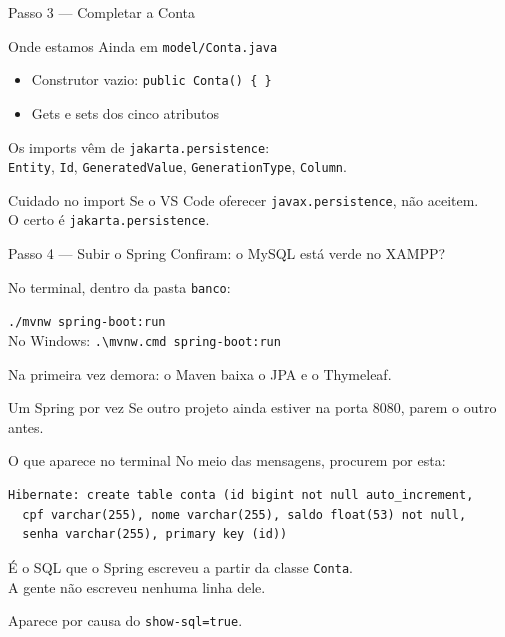 \documentclass[aspectratio=169,11pt]{beamer}
\newcommand{\onde}[1]{%
  \begin{block}{Onde estamos}
    #1
  \end{block}
}
\begin{document}
\begin{frame}{Passo 3 --- Completar a Conta}
  \onde{Ainda em \texttt{model/Conta.java}}

  \begin{itemize}
    \item Construtor vazio: \texttt{public Conta() \{ \}}
    \item Gets e sets dos cinco atributos
  \end{itemize}

  \vspace{0.5em}
  Os imports vêm de \texttt{jakarta.persistence}:\\
  \texttt{Entity}, \texttt{Id}, \texttt{GeneratedValue},
  \texttt{GenerationType}, \texttt{Column}.

  \vspace{0.5em}
  \begin{alertblock}{Cuidado no import}
    Se o VS Code oferecer \texttt{javax.persistence}, não aceitem.\\
    O certo é \texttt{jakarta.persistence}.
  \end{alertblock}
\end{frame}

\begin{frame}{Passo 4 --- Subir o Spring}
  Confiram: o MySQL está verde no XAMPP?

  \vspace{0.5em}
  No terminal, dentro da pasta \texttt{banco}:

  \vspace{0.3em}
  \texttt{./mvnw spring-boot:run}\\
  {\small No Windows: \texttt{.\textbackslash mvnw.cmd spring-boot:run}}

  \vspace{0.5em}
  Na primeira vez demora: o Maven baixa o JPA e o Thymeleaf.

  \vspace{0.5em}
  \begin{alertblock}{Um Spring por vez}
    Se outro projeto ainda estiver na porta 8080, parem o outro antes.
  \end{alertblock}
\end{frame}

\begin{frame}[fragile]{O que aparece no terminal}
  No meio das mensagens, procurem por esta:

\begin{lstlisting}[basicstyle=\ttfamily\scriptsize]
Hibernate: create table conta (id bigint not null auto_increment,
  cpf varchar(255), nome varchar(255), saldo float(53) not null,
  senha varchar(255), primary key (id))
\end{lstlisting}

  \vspace{0.4em}
  É o SQL que o Spring escreveu a partir da classe \texttt{Conta}.\\
  A gente não escreveu nenhuma linha dele.

  \vspace{0.4em}
  Aparece por causa do \texttt{show-sql=true}.
\end{frame}
\end{document}
